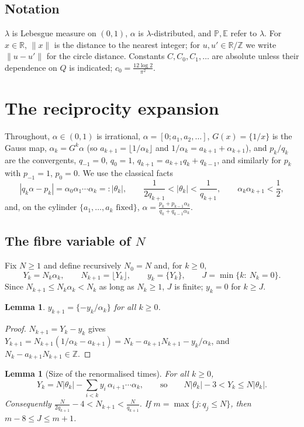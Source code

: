 \documentclass[11pt]{amsart}
\newtheorem{lemma}[theorem]{Lemma}
\theoremstyle{definition}
\numberwithin{equation}{section}
\newcommand{\R}{\mathbb{R}}
\newcommand{\Z}{\mathbb{Z}}
\newcommand{\E}{\mathbb{E}}
\newcommand{\Prob}{\mathbb{P}}
\newcommand{\fr}[1]{\{#1\}}
\begin{document}
\subsection*{Notation}
$\lambda$ is Lebesgue measure on $(0,1)$, $\alpha$ is $\lambda$-distributed, and $\Prob,\E$ refer to $\lambda$. For $x\in\R$, $\|x\|$ is the
distance to the nearest integer; for $u,u'\in\R/\Z$ we write $\|u-u'\|$ for the circle distance. Constants $C,C_0,C_1,\dots$ are absolute
unless their dependence on $Q$ is indicated; $c_0=\frac{12\log2}{\pi^2}$.
\section{The reciprocity expansion}\label{sec:renorm}

Throughout, $\alpha\in(0,1)$ is irrational, $\alpha=[0;a_1,a_2,\dots]$, $G(x)=\fr{1/x}$ is the Gauss map,
$\alpha_k=G^k\alpha$ (so $a_{k+1}=\lfloor 1/\alpha_k\rfloor$ and $1/\alpha_k=a_{k+1}+\alpha_{k+1}$), and
$p_k/q_k$ are the convergents, $q_{-1}=0$, $q_0=1$, $q_{k+1}=a_{k+1}q_k+q_{k-1}$, and similarly for $p_k$ with $p_{-1}=1$, $p_0=0$.
We use the classical facts
\begin{equation}\label{eq:theta}
|q_k\alpha-p_k|=\alpha_0\alpha_1\cdots\alpha_k=:|\theta_k|,\qquad \frac{1}{2q_{k+1}}<|\theta_k|<\frac1{q_{k+1}},\qquad
\alpha_k\alpha_{k+1}<\frac12 ,
\end{equation}
and, on the cylinder $\{a_1,\dots,a_k\text{ fixed}\}$, $\alpha=\frac{p_k+p_{k-1}\alpha_k}{q_k+q_{k-1}\alpha_k}$.

\subsection*{The fibre variable of $N$}
Fix $N\ge1$ and define recursively $N_0=N$ and, for $k\ge0$,
\[
Y_k=N_k\alpha_k,\qquad N_{k+1}=\lfloor Y_k\rfloor,\qquad y_k=\fr{Y_k},\qquad J=\min\{k:\ N_k=0\}.
\]
Since $N_{k+1}\le N_k\alpha_k<N_k$ as long as $N_k\ge1$, $J$ is finite; $y_k=0$ for $k\ge J$.

\begin{lemma}\label{lem:yrec}
$y_{k+1}=\fr{-y_k/\alpha_k}$ for all $k\ge0$.
\end{lemma}

\begin{proof}
$N_{k+1}=Y_k-y_k$ gives $Y_{k+1}=N_{k+1}(1/\alpha_k-a_{k+1})=N_k-a_{k+1}N_{k+1}-y_k/\alpha_k$, and $N_k-a_{k+1}N_{k+1}\in\Z$.
\end{proof}

\begin{lemma}[Size of the renormalised times]\label{lem:sizes}
For all $k\ge0$,
\begin{equation}\label{eq:Yk}
Y_k=N|\theta_k|-\sum_{i<k}y_i\,\alpha_{i+1}\cdots\alpha_k,\qquad\text{so}\qquad N|\theta_k|-3<Y_k\le N|\theta_k|.
\end{equation}
Consequently $\frac{N}{2q_{k+1}}-4<N_{k+1}<\frac N{q_{k+1}}$. If $m=\max\{j:q_j\le N\}$, then $m-8\le J\le m+1$.
\end{lemma}
\end{document}

